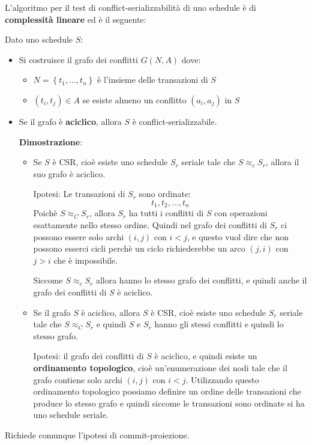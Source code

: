 \documentclass[a4paper,twoside]{article}
\begin{document}
\noindent
L'algoritmo per il test di conflict-serializzabilità di uno schedule è di \textbf{
complessità lineare} ed è il seguente:

Dato uno schedule \( S \):
\begin{itemize}
  \item Si costruisce il grafo dei conflitti \( G(N, A) \) dove:
    \begin{itemize}
      \item \( N = \left\{ t_1, \ldots, t_n \right\} \) è l'insieme delle transazioni
        di \( S \) 

      \item \( (t_i, t_j) \in A \) se esiste almeno un conflitto \( (a_i, a_j) \) in 
        \( S \)
    \end{itemize}

  \item Se il grafo è \textbf{aciclico}, allora \( S \) è conflict-serializzabile.

    \vspace{1em}
    \noindent
    \textbf{Dimostrazione}:
    \begin{itemize}
      \item 
        Se \( S \) è CSR, cioè esiste uno schedule \( S_r \) seriale tale che
        \( S \approx_c S_r \), allora il suo grafo è aciclico.

        Ipotesi: Le transazioni di \( S_r \) sono ordinate:
        \[
          t_1, t_2, \ldots, t_n
        \] 
        Poichè \( S \approx_C S_r \), allora \( S_r \) ha tutti i conflitti di \( S \)
        con operazioni esattamente nello stesso ordine. Quindi nel grafo dei conflitti
        di \( S_r \) ci possono essere solo archi \( (i,j) \) con \( i < j \), e questo
        vuol dire che non possono esserci cicli perchè un ciclo richiederebbe un arco 
        \( (j,i) \) con \( j > i \) che è impossibile.

        Siccome \( S \approx_c S_r \) allora hanno lo stesso grafo dei conflitti, e quindi
        anche il grafo dei conflitti di \( S \) è aciclico.

      \item 
        Se il grafo \( S \) è aciclico, allora \( S \) è CSR, cioè esiste uno schedule
        \( S_r \) seriale tale che \( S \approx_C S_r \) e quindi \( S \) e \( S_r \) 
        hanno gli stessi conflitti e quindi lo stesso grafo.

        Ipotesi: il grafo dei conflitti di \( S \) è aciclico, e quindi esiste un
        \textbf{ordinamento topologico}, cioè un'enumerazione dei nodi tale che
        il grafo contiene solo archi \( (i,j) \) con \( i < j \).
        Utilizzando questo ordinamento topologico possiamo definire un ordine
        delle transazioni che produce lo stesso grafo e quindi siccome le transazioni
        sono ordinate si ha uno schedule seriale.
    \end{itemize}
\end{itemize}
Richiede comunque l'ipotesi di commit-proiezione.
\end{document}
